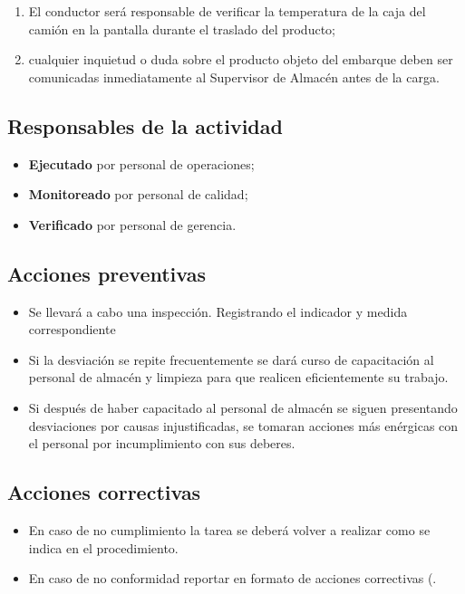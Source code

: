 \begin{enumerate}
	\item El conductor será responsable de verificar la temperatura de la caja del camión en la pantalla durante el traslado del producto;
	\item cualquier inquietud o duda sobre el producto objeto del embarque deben ser comunicadas inmediatamente al Supervisor de Almacén antes de la carga.
\end{enumerate}

\subsection{Responsables de la actividad}

\begin{itemize}
	\item \textbf{Ejecutado} por personal de operaciones;
	\item \textbf{Monitoreado} por personal de calidad;
	\item \textbf{Verificado} por personal de gerencia.
\end{itemize}

\subsection{Acciones preventivas}

\begin{itemize}
	\item Se llevará a cabo una inspección. Registrando el indicador y medida correspondiente
	\item Si la desviación se repite frecuentemente se dará curso de capacitación al personal de almacén y limpieza para que realicen eficientemente su trabajo.
	\item Si después de haber capacitado al personal de almacén se siguen presentando desviaciones por causas injustificadas, se tomaran acciones más enérgicas con el personal por incumplimiento con sus deberes.
\end{itemize}

\subsection{Acciones correctivas}

\begin{itemize}
	\item En caso de no cumplimiento la tarea se deberá volver a realizar como se indica en el procedimiento.
	\item En caso de no conformidad reportar en formato de acciones correctivas (\RAC.
\end{itemize}

